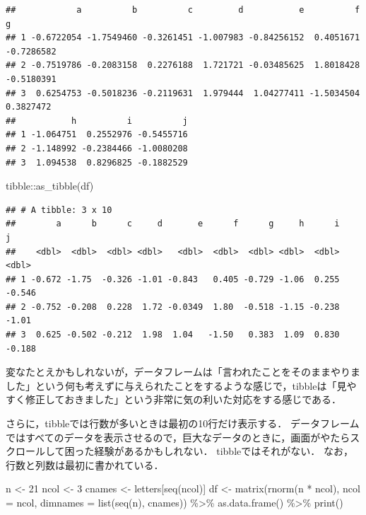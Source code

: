 \documentclass[
]{article}
\newenvironment{Shaded}{\begin{snugshade}}{\end{snugshade}}
\newcommand{\AttributeTok}[1]{\textcolor[rgb]{0.77,0.63,0.00}{#1}}
\newcommand{\DecValTok}[1]{\textcolor[rgb]{0.00,0.00,0.81}{#1}}
\newcommand{\FunctionTok}[1]{\textcolor[rgb]{0.00,0.00,0.00}{#1}}
\newcommand{\NormalTok}[1]{#1}
\newcommand{\OtherTok}[1]{\textcolor[rgb]{0.56,0.35,0.01}{#1}}
\newcommand{\SpecialCharTok}[1]{\textcolor[rgb]{0.00,0.00,0.00}{#1}}
\begin{document}
\begin{verbatim}
##            a          b          c         d           e          f          g
## 1 -0.6722054 -1.7549460 -0.3261451 -1.007983 -0.84256152  0.4051671 -0.7286582
## 2 -0.7519786 -0.2083158  0.2276188  1.721721 -0.03485625  1.8018428 -0.5180391
## 3  0.6254753 -0.5018236 -0.2119631  1.979444  1.04277411 -1.5034504  0.3827472
##           h          i          j
## 1 -1.064751  0.2552976 -0.5455716
## 2 -1.148992 -0.2384466 -1.0080208
## 3  1.094538  0.8296825 -0.1882529
\end{verbatim}

\begin{Shaded}
\begin{Highlighting}[]
\NormalTok{tibble}\SpecialCharTok{::}\FunctionTok{as\_tibble}\NormalTok{(df)}
\end{Highlighting}
\end{Shaded}

\begin{verbatim}
## # A tibble: 3 x 10
##        a      b      c     d       e      f      g     h      i      j
##    <dbl>  <dbl>  <dbl> <dbl>   <dbl>  <dbl>  <dbl> <dbl>  <dbl>  <dbl>
## 1 -0.672 -1.75  -0.326 -1.01 -0.843   0.405 -0.729 -1.06  0.255 -0.546
## 2 -0.752 -0.208  0.228  1.72 -0.0349  1.80  -0.518 -1.15 -0.238 -1.01 
## 3  0.625 -0.502 -0.212  1.98  1.04   -1.50   0.383  1.09  0.830 -0.188
\end{verbatim}

変なたとえかもしれないが，データフレームは「言われたことをそのままやりました」という何も考えずに与えられたことをするような感じで，tibbleは「見やすく修正しておきました」という非常に気の利いた対応をする感じである．

さらに，tibbleでは行数が多いときは最初の10行だけ表示する．
データフレームではすべてのデータを表示させるので，巨大なデータのときに，画面がやたらスクロールして困った経験があるかもしれない．
tibbleではそれがない．
なお，行数と列数は最初に書かれている．

\begin{Shaded}
\begin{Highlighting}[]
\NormalTok{n }\OtherTok{\textless{}{-}} \DecValTok{21}
\NormalTok{ncol }\OtherTok{\textless{}{-}} \DecValTok{3}
\NormalTok{cnames }\OtherTok{\textless{}{-}}\NormalTok{ letters[}\FunctionTok{seq}\NormalTok{(ncol)]}
\NormalTok{df }\OtherTok{\textless{}{-}} 
  \FunctionTok{matrix}\NormalTok{(}\FunctionTok{rnorm}\NormalTok{(n }\SpecialCharTok{*}\NormalTok{ ncol), }\AttributeTok{ncol =}\NormalTok{ ncol, }\AttributeTok{dimnames =} \FunctionTok{list}\NormalTok{(}\FunctionTok{seq}\NormalTok{(n), cnames)) }\SpecialCharTok{\%\textgreater{}\%}
  \FunctionTok{as.data.frame}\NormalTok{() }\SpecialCharTok{\%\textgreater{}\%}
  \FunctionTok{print}\NormalTok{()}
\end{Highlighting}
\end{Shaded}
\end{document}
